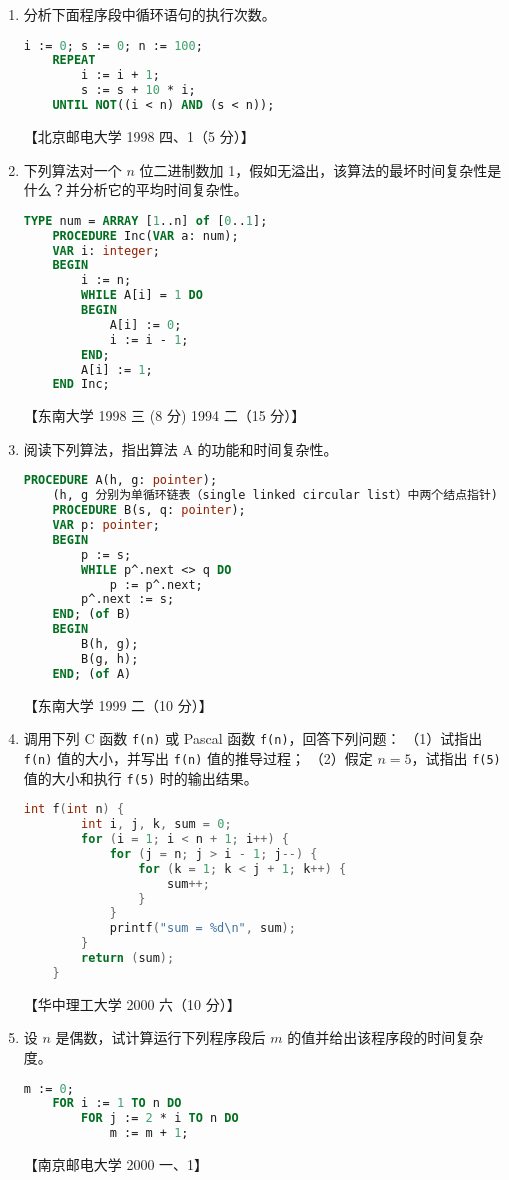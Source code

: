 \documentclass[lang=cn,newtx,10pt,scheme=chinese]{elegantbook}
\begin{document}
\begin{enumerate}
    \item 分析下面程序段中循环语句的执行次数。  
    \begin{lstlisting}[language=Pascal]
    i := 0; s := 0; n := 100;
    REPEAT
        i := i + 1;
        s := s + 10 * i;
    UNTIL NOT((i < n) AND (s < n));
    \end{lstlisting}
    【北京邮电大学 1998 四、1（5 分）】

    \item 下列算法对一个 $n$ 位二进制数加 1，假如无溢出，该算法的最坏时间复杂性是什么？并分析它的平均时间复杂性。  
    \begin{lstlisting}[language=Pascal]
    TYPE num = ARRAY [1..n] of [0..1];
    PROCEDURE Inc(VAR a: num);
    VAR i: integer;
    BEGIN
        i := n;
        WHILE A[i] = 1 DO
        BEGIN
            A[i] := 0;
            i := i - 1;
        END;
        A[i] := 1;
    END Inc;
    \end{lstlisting}
    【东南大学 1998 三 (8 分) 1994 二（15 分）】

    \item 阅读下列算法，指出算法 A 的功能和时间复杂性。  
    \begin{lstlisting}[language=Pascal]
    PROCEDURE A(h, g: pointer);
    (h, g 分别为单循环链表（single linked circular list）中两个结点指针)
    PROCEDURE B(s, q: pointer);
    VAR p: pointer;
    BEGIN
        p := s;
        WHILE p^.next <> q DO
            p := p^.next;
        p^.next := s;
    END; (of B)
    BEGIN
        B(h, g);
        B(g, h);
    END; (of A)
    \end{lstlisting}
    【东南大学 1999 二（10 分）】

    \item 调用下列 C 函数 \texttt{f(n)} 或 Pascal 函数 \texttt{f(n)}，回答下列问题：  
    （1）试指出 \texttt{f(n)} 值的大小，并写出 \texttt{f(n)} 值的推导过程；  
    （2）假定 $n = 5$，试指出 \texttt{f(5)} 值的大小和执行 \texttt{f(5)} 时的输出结果。  
    \begin{lstlisting}[language=C]
    int f(int n) {
        int i, j, k, sum = 0;
        for (i = 1; i < n + 1; i++) {
            for (j = n; j > i - 1; j--) {
                for (k = 1; k < j + 1; k++) {
                    sum++;
                }
            }
            printf("sum = %d\n", sum);
        }
        return (sum);
    }
    \end{lstlisting}
    【华中理工大学 2000 六（10 分）】

    \item 设 $n$ 是偶数，试计算运行下列程序段后 $m$ 的值并给出该程序段的时间复杂度。  
    \begin{lstlisting}[language=Pascal]
    m := 0;
    FOR i := 1 TO n DO
        FOR j := 2 * i TO n DO
            m := m + 1;
    \end{lstlisting}
    【南京邮电大学 2000 一、1】


\end{enumerate}
\end{document}
